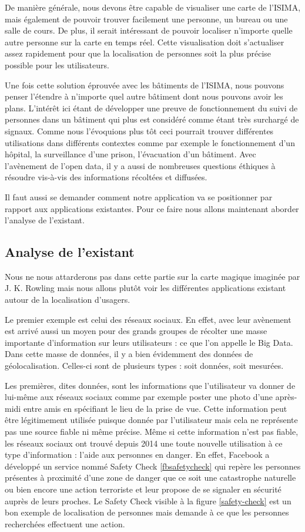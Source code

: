 De manière générale, nous devons être capable de visualiser une carte de l'ISIMA, mais également de pouvoir trouver facilement une personne, un bureau ou une salle de cours. De plus, il serait intéressant de pouvoir localiser n'importe quelle autre personne sur la carte en temps réel. Cette visualisation doit s'actualiser assez rapidement pour que la localisation de personnes soit la plus précise possible pour les utilisateurs.

Une fois cette solution éprouvée avec les bâtiments de l'ISIMA, nous pouvons penser l'étendre à n'importe quel autre bâtiment dont nous pouvons avoir les plans. L’intérêt ici étant de développer une preuve de fonctionnement du suivi de personnes dans un bâtiment qui plus est considéré comme étant très surchargé de signaux. Comme nous l’évoquions plus tôt ceci pourrait trouver différentes utilisations dans différents contextes comme par exemple le fonctionnement d’un hôpital, la surveillance d’une prison, l’évacuation d’un bâtiment. Avec l’avènement de l’open data, il y a aussi de nombreuses questions éthiques à résoudre vis-à-vis des informations récoltées et diffusées.

Il faut aussi se demander comment notre application va se positionner par rapport aux applications existantes. Pour ce faire nous allons maintenant aborder l’analyse de l’existant.


\subsection{Analyse de l'existant}

Nous ne nous attarderons pas dans cette partie sur la carte magique imaginée par J. K. Rowling mais nous allons plutôt voir les différentes applications existant autour de la localisation d’usagers.

Le premier exemple est celui des réseaux sociaux. En effet, avec leur avènement est arrivé aussi un moyen pour des grands groupes de récolter une masse importante d’information sur leurs utilisateurs : ce que l’on appelle le Big Data. Dans cette masse de données, il y a bien évidemment des données de géolocalisation. Celles-ci sont de plusieurs types : soit données, soit mesurées.

Les premières, dites données, sont les informations que l’utilisateur va donner de lui-même aux réseaux sociaux comme par exemple poster une photo d’une après-midi entre amis en spécifiant le lieu de la prise de vue. Cette information peut être légitimement utilisée puisque donnée par l’utilisateur mais cela ne représente pas une source fiable ni même précise. Même si cette information n’est pas fiable, les réseaux sociaux ont trouvé depuis 2014 une toute nouvelle utilisation à ce type d’information : l’aide aux personnes en danger. En effet, Facebook a développé un service nommé Safety Check \ref{fbsafetycheck} qui repère les personnes présentes à proximité d’une zone de danger que ce soit une catastrophe naturelle ou bien encore une action terroriste et leur propose de se signaler en sécurité auprès de leurs proches. Le Safety Check visible à la figure \ref{safety-check} est un bon exemple de localisation de personnes mais demande à ce que les personnes recherchées effectuent une action.

